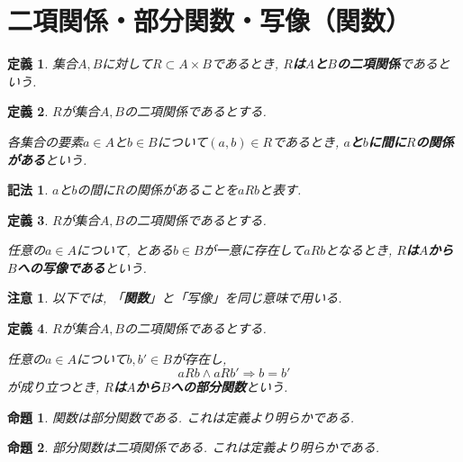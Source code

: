 \documentclass{jsbook}
\theoremstyle{plain}
\newtheorem{Def}{定義}[chapter]
\newtheorem{Notation}{記法}[chapter]
\newtheorem{Prop}{命題}[chapter]
\newtheorem{caution}{注意}[chapter]
\begin{document}
\section{二項関係・部分関数・写像（関数）}
\begin{Def}
集合$A,B$に対して$R\subset A\times B$であるとき, {\bf $R$は$A$と$B$の二項関係}であるという.
\end{Def}
\begin{Def}
$R$が集合$A,B$の二項関係であるとする.

各集合の要素$a\in A$と$b\in B$について$(a,b)\in R$であるとき,
{\bf $a$と$b$に間に$R$の関係がある}という.
\end{Def}
\begin{Notation}
$a$と$b$の間に$R$の関係があることを$aRb$と表す.
\end{Notation}
\begin{Def}
$R$が集合$A,B$の二項関係であるとする.

任意の$a\in A$について, とある$b\in B$が一意に存在して$aRb$となるとき,
{\bf $R$は$A$から$B$への写像である}という.
\end{Def}
\begin{caution}
以下では, 「{\bf 関数}」と「写像」を同じ意味で用いる.
\end{caution}
\begin{Def}
$R$が集合$A,B$の二項関係であるとする.

任意の$a\in A$について$b,b'\in B$が存在し,
\[
aRb\land aRb'\Rightarrow b=b'
\]
が成り立つとき, {\bf $R$は$A$から$B$への部分関数}という.
\end{Def}
\begin{Prop}
関数は部分関数である. これは定義より明らかである.
\end{Prop}
\begin{Prop}
部分関数は二項関係である. これは定義より明らかである.
\end{Prop}
\end{document}
